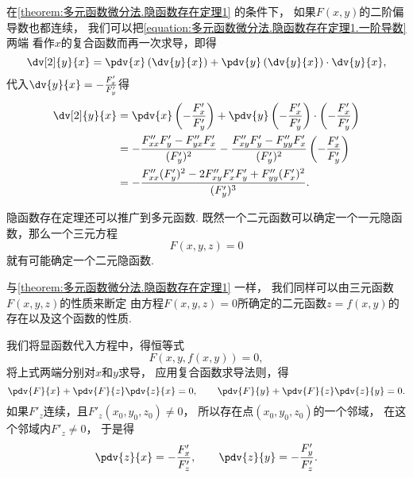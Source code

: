 在\cref{theorem:多元函数微分法.隐函数存在定理1} 的条件下，
如果\(F(x,y)\)的二阶偏导数也都连续，
我们可以把\cref{equation:多元函数微分法.隐函数存在定理1.一阶导数} 两端
看作\(x\)的复合函数而再一次求导，即得\begin{equation*}
	\dv[2]{y}{x}
	= \pdv{x}\left(\dv{y}{x}\right)
	+ \pdv{y}\left(\dv{y}{x}\right) \cdot \dv{y}{x},
\end{equation*}
代入\(\dv{y}{x}=-\frac{F'_x}{F'_y}\)得\begin{align}
	\dv[2]{y}{x}
	&= \pdv{x}\left(-\frac{F'_x}{F'_y}\right)
	+ \pdv{y}\left(-\frac{F'_x}{F'_y}\right) \cdot \left(-\frac{F'_x}{F'_y}\right) \notag\\
	&= -\frac{F''_{xx}F'_y-F''_{yx}F'_x}{(F'_y)^2}
	- \frac{F''_{xy}F'_y-F''_{yy}F'_x}{(F'_y)^2}
	\left(-\frac{F'_x}{F'_y}\right) \notag\\
	&= -\frac{F''_{xx}(F'_y)^2-2F''_{xy}F'_xF'_y+F''_{yy}(F'_x)^2}{(F'_y)^3}.
\end{align}%

隐函数存在定理还可以推广到多元函数.
既然一个二元函数可以确定一个一元隐函数，那么一个三元方程\begin{equation*}
	F(x,y,z) = 0
\end{equation*}就有可能确定一个二元隐函数.

与\cref{theorem:多元函数微分法.隐函数存在定理1} 一样，
我们同样可以由三元函数\(F(x,y,z)\)的性质来断定
由方程\(F(x,y,z) = 0\)所确定的二元函数\(z = f(x,y)\)的存在以及这个函数的性质.

我们将显函数代入方程中，得恒等式\begin{equation*}
	F(x,y,f(x,y))=0,
\end{equation*}
将上式两端分别对\(x\)和\(y\)求导，
应用复合函数求导法则，得\begin{equation*}
	\pdv{F}{x} + \pdv{F}{z} \pdv{z}{x} = 0, \qquad
	\pdv{F}{y} + \pdv{F}{z} \pdv{z}{y} = 0.
\end{equation*}
如果\(F'_z\)连续，且\(F'_z(x_0,y_0,z_0)\neq0\)，
所以存在点\((x_0,y_0,z_0)\)的一个邻域，
在这个邻域内\(F'_z\neq0\)，
于是得\begin{equation*}
	\pdv{z}{x}=-\frac{F'_x}{F'_z}, \qquad
	\pdv{z}{y}=-\frac{F'_y}{F'_z}.
\end{equation*}

